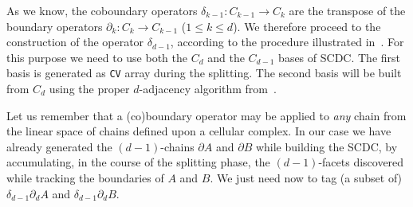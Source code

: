 \documentclass[11pt,oneside]{article}	%
\begin{document}
As we know, the  coboundary operators $\delta_{k-1}: C_{k-1} \to C_k$ are the transpose of the boundary operators $\partial_k: C_k \to C_{k-1}$ ($1\leq k\leq d$). We therefore proceed to the construction of the operator $\delta_{d-1}$, according to the procedure illustrated in~\cite{}. For this purpose we need to use both the $C_d$ and the $C_{d-1}$ bases of SCDC. The first basis is generated as \texttt{CV} array during the splitting. The second basis will be built from $C_d$ using the proper $d$-adjacency algorithm from~\cite{}. 

Let us remember that a (co)boundary operator may be applied to \emph{any} chain from the linear space of chains defined upon a cellular complex. 
In our case we have already generated the $(d-1)$-chains $\partial A$ and $\partial B$ while building the SCDC, by accumulating, in the course of the splitting phase, the $(d-1)$-facets discovered while tracking the boundaries of $A$ and $B$. We just need now to tag (a subset of) $\delta_{d-1}\partial_d A$ and $\delta_{d-1}\partial_d B$.
\end{document}
